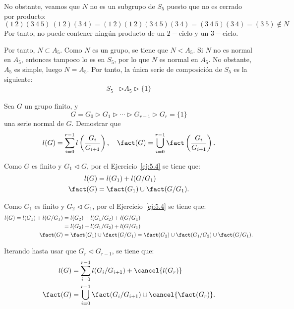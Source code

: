 \begin{ejercicio}
\begin{enumerate}
\begin{itemize}
            No obstante, veamos que $N$ no es un subgrupo de $S_5$ puesto que no es cerrado por producto:
            \begin{equation*}
                (1\ 2)(3\ 4\ 5)\ (1\ 2)(3\ 4) = (1\ 2)(1\ 2)(3\ 4\ 5)(3\ 4)
                = (3\ 4\ 5)(3\ 4) = (3\ 5)\notin N
            \end{equation*}
            Por tanto, no puede contener ningún producto de un $2-$ciclo y un $3-$ciclo.
        \end{itemize}
        Por tanto, $N\subset A_5$. Como $N$ es un grupo, se tiene que $N<A_5$. Si $N$ no es normal en $A_5$, entonces tampoco lo es en $S_5$, por lo que $N$ es normal en $A_5$. No obstante, $A_5$ es simple, luego $N=A_5$.
        Por tanto, la única serie de composición de $S_5$ es la siguiente:
        \begin{align*}
            S_5 &\rhd A_5 \rhd \{1\}
        \end{align*}
    \end{enumerate}
\end{ejercicio}

\begin{ejercicio}\label{ej:5.6}
    Sea $G$ un grupo finito, y
    \[
        G = G_0 \rhd G_1 \rhd \cdots \rhd G_{r-1} \rhd G_r = \{1\}
    \]
    una serie normal de $G$. Demostrar que
    \[
        l(G) = \sum_{i=0}^{r-1} l\left(\frac{G_i}{G_{i+1}}\right), \quad \fact(G) = \bigcup_{i=0}^{r-1} \fact\left(\frac{G_i}{G_{i+1}}\right).
    \]

    Como $G$ es finito y $G_1\lhd G$, por el Ejercicio~\ref{ej:5.4} se tiene que:
    \begin{align*}
        l(G) &= l(G_1) + l(G/G_1) \\
        \fact(G) &= \fact(G_1)\cup\fact(G/G_1).
    \end{align*}

    Como $G_1$ es finito y $G_2\lhd G_1$, por el Ejercicio~\ref{ej:5.4} se tiene que:
    \begin{align*}
        l(G) = l(G_1) + l(G/G_1) &= l(G_2) + l(G_1/G_2) + l(G/G_1) \\
        &= l(G_2) + l(G_1/G_2) + l(G/G_1) \\
        \fact(G) &= \fact(G_1)\cup\fact(G/G_1) = \fact(G_2)\cup\fact(G_1/G_2)\cup\fact(G/G_1).
    \end{align*}

    Iterando hasta usar que $G_{r}\lhd G_{r-1}$, se tiene que:
    \begin{align*}
        l(G) &= \sum_{i=0}^{r-1} l(G_i/G_{i+1}) + \cancel{l(G_r)} \\
        \fact(G) &= \bigcup_{i=0}^{r-1} \fact(G_i/G_{i+1}) \cup \cancel{\fact(G_r)}.
    \end{align*}
\end{ejercicio}

